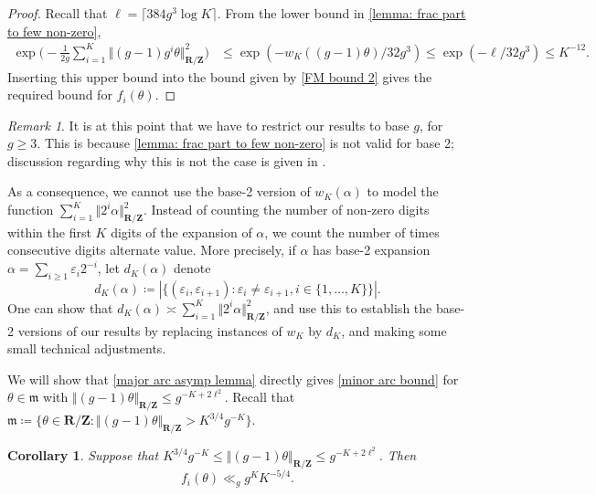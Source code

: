 \documentclass[hidelinks,11pt,reqno]{amsart}
\renewcommand{\leq}{\leqslant}
\renewcommand{\geq}{\geqslant}
\newcommand{\Z}{\ensuremath{\mathbf{Z}}}
\newcommand{\R}{\ensuremath{\mathbf{R}}}
\newcommand{\st}{\ensuremath{:}}
\newcommand{\Vertr}{\Vert_{\R/\Z}}
\newcommand{\V}[1]{\Vert #1 \Vertr}
\newtheorem{cor}[prop]{Corollary}
\theoremstyle{remark}
\newtheorem*{remark}{Remark}
\begin{document}
\begin{proof} Recall that $\ell =\lceil 384g^{3}\log K \rceil$. From the lower bound in \cref{lemma: frac part to few non-zero},
    \begin{align*}
        \exp\Big (-\frac{1}{2g}\sum_{i=1}^{K}\V{(g-1)g^{i}\theta}^{2}\Big)&\leq \exp (-w_{K}((g-1)\theta)/32g^{3})\leq \exp(-\ell/32g^{3})\leq K^{-12}.
    \end{align*}
    Inserting this upper bound into the bound given by \cref{FM bound 2} gives the required bound for $f_{i}(\theta)$.
\end{proof}
\begin{remark}\label{base 2 remark}
    It is at this point that we have to restrict our results to base $g$, for $g\geq 3$. This is because \cref{lemma: frac part to few non-zero} is not valid for base 2; discussion regarding why this is not the case is given in \cite{green2025waring}. 
    
   As a consequence, we cannot use the base-2 version of $w_{K}(\alpha)$ to model the function $\sum_{i=1}^{K}\V{2^{i}\alpha}^{2}$. Instead of counting the number of non-zero digits within the first $K$ digits of the expansion of $\alpha$, we count the number of times consecutive digits alternate value. More precisely, if $\alpha$ has base-2 expansion $\alpha=\sum_{i\geq 1}\varepsilon_{i}2^{-i}$, let $d_{K}(\alpha)$ denote
    \[d_{K}(\alpha )\coloneq |\{(\varepsilon_{i},\varepsilon_{i+1})\st \varepsilon_{i}\neq \varepsilon_{i+1}, i\in \{1,\ldots, K\}\}|.\]
    One can show that $d_{K}(\alpha)\asymp \sum_{i=1}^{K}\V{2^{i}\alpha}^{2}$, and use this to establish the base-2 versions of our results by replacing instances of $w_{K}$ by $d_{K}$, and making some small technical adjustments.
\end{remark}
We will show that \cref{major arc asymp lemma} directly gives \cref{minor arc bound} for $\theta \in \mathfrak{m}$ with $\V{(g-1)\theta}\leq g^{-K+2\ell^{2}}$. Recall that $\mathfrak{m}\coloneq \{\theta\in \R/\Z \st\V{(g-1)\theta}> K^{3/4}g^{-K}\}$.
\begin{cor}\label{close to zero minor arc}
    Suppose that $K^{3/4}g^{-K}\leq \V{(g-1)\theta}\leq g^{-K+2\ell^{2}}$. Then
    \[f_{i}(\theta)\ll_{g} {g^{K}}{K^{-5/4}}.\]
\end{cor}
\end{document}
